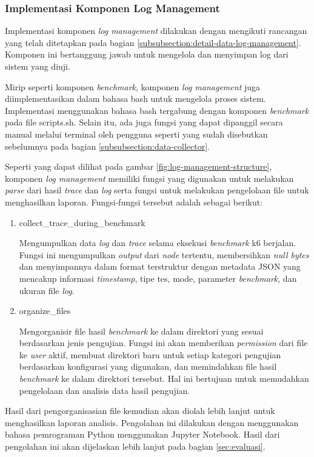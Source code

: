 \subsubsection{Implementasi Komponen Log Management}
\label{subsubsection:implementasi-log-management}

Implementasi komponen \textit{log management} dilakukan dengan mengikuti rancangan yang telah ditetapkan pada bagian \ref{subsubsection:detail-data-log-management}. Komponen ini bertanggung jawab untuk mengelola dan menyimpan log dari sistem yang diuji.

Mirip seperti komponen \textit{benchmark}, komponen \textit{log management} juga diimplementasikan dalam bahasa bash untuk mengelola proses sistem. Implementasi menggunakan bahasa bash tergabung dengan komponen \textit{benchmark} pada file scripts.sh. Selain itu, ada juga fungsi yang dapat dipanggil secara manual melalui terminal oleh pengguna seperti yang sudah disebutkan sebelumnya pada bagian \ref{subsubsection:data-collector}.

Seperti yang dapat dilihat pada gambar \ref{fig:log-management-structure}, komponen \textit{log management} memiliki fungsi yang digunakan untuk melakukan \textit{parse} dari hasil \textit{trace} dan \textit{log} serta fungsi untuk melakukan pengelolaan file untuk menghasilkan laporan. Fungsi-fungsi tersebut adalah sebagai berikut:

\begin{enumerate}
  \item collect\_trace\_during\_benchmark
  
  Mengumpulkan data \textit{log} dan \textit{trace} selama eksekusi \textit{benchmark} k6 berjalan. Fungsi ini mengumpulkan \textit{output} dari \textit{node} tertentu, membersihkan \textit{null bytes} dan menyimpannya dalam format terstruktur dengan metadata JSON yang mencakup informasi \textit{timestamp}, tipe tes, mode, parameter \textit{benchmark}, dan ukuran file \textit{log}.

  \item organize\_files
  
  Mengorganisir file hasil \textit{benchmark} ke dalam direktori yang sesuai berdasarkan jenis pengujian. Fungsi ini akan memberikan \textit{permission} dari file ke \textit{user} aktif, membuat direktori baru untuk setiap kategori pengujian berdasarkan konfigurasi yang digunakan, dan memindahkan file hasil \textit{benchmark} ke dalam direktori tersebut. Hal ini bertujuan untuk memudahkan pengelolaan dan analisis data hasil pengujian.

\end{enumerate}

Hasil dari pengorganisasian file kemudian akan diolah lebih lanjut untuk menghasilkan laporan analisis. Pengolahan ini dilakukan dengan menggunakan bahasa pemrograman Python menggunakan Jupyter Notebook. Hasil dari pengolahan ini akan dijelaskan lebih lanjut pada bagian \ref{sec:evaluasi}.